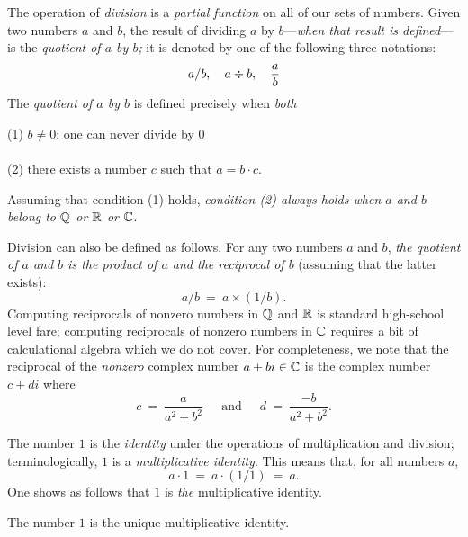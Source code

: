The operation of {\it division} is a {\em
  partial function} on all of our sets of numbers.  Given two numbers
$a$ and $b$, the result of dividing $a$ by $b$---{\em when that result
  is defined}---is the {\it quotient of $a$ by $b$;}
it is denoted by one of the following three notations:
\[  a/b, \ \ \ a \div b, \ \ \ {a \over b}  \]
The {\it quotient of $a$ by $b$} is defined precisely when {\em both}

\noindent
\hspace*{.35in}(1) $b \neq 0$: one can never divide by $0$ \\
\hspace*{.35in}{\em and} \\
\hspace*{.35in}(2) there exists a number $c$ such that $a = b \cdot c$.

\noindent
Assuming that condition (1) holds, {\em condition (2) always holds
  when $a$ and $b$ belong to $\mathbb{Q}$ or $\mathbb{R}$ or $\mathbb{C}$}.

Division can also be defined as follows.  For any two numbers $a$
and $b$, {\em the quotient of $a$ and $b$ is the product of $a$ and the
reciprocal of $b$} (assuming that the latter exists):
\[ a/b \ = \ a \times (1/b). \]
Computing reciprocals of nonzero numbers in $\mathbb{Q}$ and $\mathbb{R}$ is standard
high-school level fare; computing reciprocals of nonzero numbers in
$\mathbb{C}$ requires a bit of calculational algebra which we do not cover.
For completeness, we note that the reciprocal of the {\em nonzero}
complex number $a + bi \in \mathbb{C}$ is the complex number $c+di$ where
\[ c \ = \ \frac{a}{a^2 + b^2} \ \ \ \ \
\mbox{ and } \ \ \ \ \
d \ = \ \frac{-b}{a^2 + b^2}.
\]

\medskip

%
The number $1$ is the {\it identity} under the operations of
multiplication and division;
\index{number!identity under multiplication}
terminologically, $1$ is a {\it multiplicative identity}.  This means
that, for all numbers $a$,
\[ a \cdot 1 \ = \ a \cdot (1/1) \ = \ a. \]
One shows as follows that $1$ is {\em the} multiplicative identity.

\begin{prop}
\label{thm:unique-mult-iden}
The number $1$ is the unique multiplicative identity.
\end{prop}

